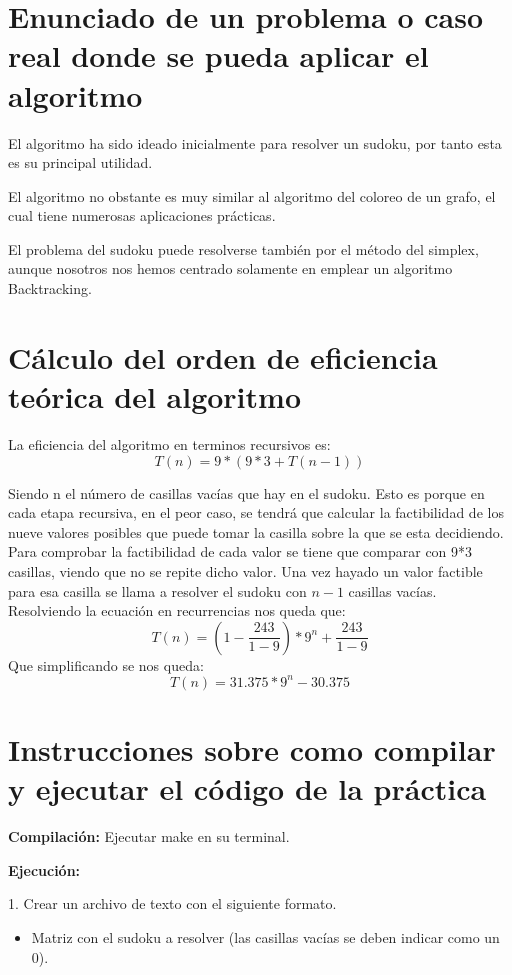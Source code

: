 \documentclass[11pt, a4paper]{article}
\theoremstyle{theorem-style}
\theoremstyle{definition-style}
\theoremstyle{remark-style}
\theoremstyle{example-style}
\begin{document}
\section{Enunciado de un problema o caso real donde se pueda aplicar el algoritmo}

El algoritmo ha sido ideado inicialmente para resolver un sudoku, por tanto esta es su principal utilidad. 

El algoritmo no obstante es muy similar al algoritmo del coloreo de un grafo, el cual tiene numerosas aplicaciones prácticas.

El problema del sudoku puede resolverse también por el método del simplex, aunque nosotros nos hemos centrado solamente en emplear un algoritmo Backtracking.

\section{Cálculo del orden de eficiencia teórica del algoritmo }
La eficiencia del algoritmo en terminos recursivos es: $$ T(n) = 9*(9*3 + T(n-1))$$

Siendo n el número de casillas vacías que hay en el sudoku. Esto es porque en cada etapa recursiva, en el peor caso, se tendrá que calcular la factibilidad de los nueve valores posibles que puede tomar la casilla sobre la que se esta decidiendo. Para comprobar la factibilidad de cada valor se tiene que comparar con 9*3 casillas, viendo que no se repite dicho valor. Una vez hayado un valor factible para esa casilla se llama a resolver el sudoku con $n-1$ casillas vacías. Resolviendo la ecuación en recurrencias nos queda que: $$ T(n) = (1 - \frac{243}{1-9})*9^n + \frac{243}{1-9}$$ Que simplificando se nos queda: $$T(n) = 31.375*9^n - 30.375 $$



\section{Instrucciones sobre como compilar y ejecutar el código de la práctica}


\textbf{Compilación:} Ejecutar make en su terminal.

\textbf{Ejecución:} 

1. Crear un archivo de texto con el siguiente formato.
\begin{itemize}
\item Matriz con el sudoku a resolver (las casillas vacías se deben indicar como un 0).
\end{itemize}
\end{document}
